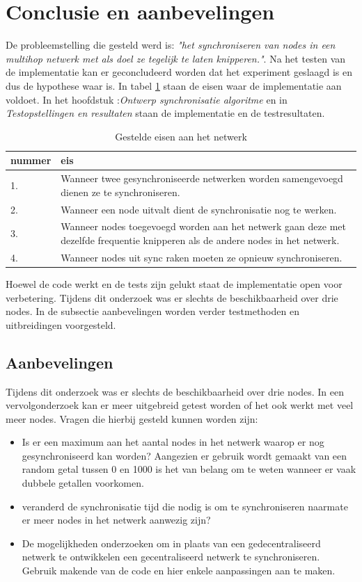 \documentclass{article}
\begin{document}
\section{Conclusie en aanbevelingen}
De probleemstelling die gesteld werd is: \textit{"het synchroniseren van nodes in een multihop netwerk met als doel ze tegelijk te laten knipperen."}. Na het testen van de implementatie kan er geconcludeerd worden dat het experiment geslaagd is en dus de hypothese waar is. In tabel \ref{tab: Gestelde eisen} staan de eisen waar de implementatie aan voldoet. In het hoofdstuk :\textit{Ontwerp synchronisatie algoritme} en in \textit{Testopstellingen en resultaten} staan de implementatie en de testresultaten. 
\begin{table}[h]
	\centering\caption{Gestelde eisen aan het netwerk}
	\label{tab: Gestelde eisen}
	\begin{tabular}{l|p{10cm}}
	\textbf{nummer} & \textbf{eis} \\ \hline\hline
	1. & Wanneer twee gesynchroniseerde netwerken worden samengevoegd 
	dienen ze te synchroniseren. \\ \hline
	2. & Wanneer een node uitvalt dient de synchronisatie 
	nog te werken. \\ \hline
	3. & Wanneer nodes toegevoegd worden aan het netwerk gaan deze met dezelfde
	 frequentie knipperen als de andere nodes in het netwerk.\\ \hline
	4. & Wanneer nodes uit sync raken moeten ze opnieuw synchroniseren. \\ \hline
	\end{tabular}
\end{table}
\newline
Hoewel de code werkt en de tests zijn gelukt staat de implementatie open voor verbetering. Tijdens dit onderzoek was er slechts de beschikbaarheid over drie nodes. In de subsectie aanbevelingen worden verder testmethoden en uitbreidingen voorgesteld. 
\subsection{Aanbevelingen}
Tijdens dit onderzoek was er slechts de beschikbaarheid over drie nodes. In een vervolgonderzoek kan er meer uitgebreid getest worden of het ook werkt met veel meer nodes. Vragen die hierbij gesteld kunnen worden zijn:
\begin{itemize}
	\item Is er een maximum aan het aantal nodes in het netwerk waarop er nog gesynchroniseerd kan worden? Aangezien er gebruik wordt gemaakt van een random getal tussen 0 en 1000 is het van belang om te weten wanneer er vaak dubbele getallen voorkomen. 
	\item veranderd de synchronisatie tijd die nodig is om te synchroniseren naarmate er meer nodes in het netwerk aanwezig zijn?
	\item De mogelijkheden onderzoeken om in plaats van een gedecentraliseerd netwerk te ontwikkelen een gecentraliseerd netwerk te synchroniseren. Gebruik makende van de code en hier enkele aanpassingen aan te maken. 
\end{itemize}
\newpage
\end{document}
